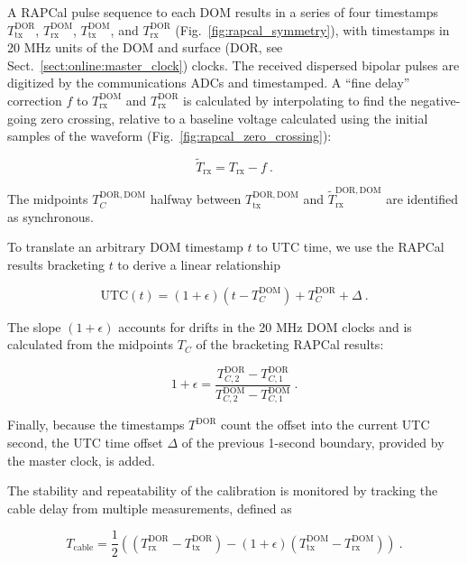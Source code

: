 A RAPCal pulse sequence to each DOM results in a series of four timestamps
$T_{\mathrm{tx}}^{\mathrm{DOR}}$, $T_{\mathrm{rx}}^{\mathrm{DOM}}$, 
$T_{\mathrm{tx}}^{\mathrm{DOM}}$,  and $T_{\mathrm{rx}}^{\mathrm{DOR}}$
(Fig.~\ref{fig:rapcal_symmetry}), with timestamps in 20 MHz units
of the DOM and surface (DOR, see Sect.~\ref{sect:online:master_clock}) clocks.  The received dispersed bipolar pulses
are digitized by the communications ADCs and 
timestamped.  A ``fine delay'' correction $f$ to
$T_{\mathrm{rx}}^{\mathrm{DOM}}$ and $T_{\mathrm{rx}}^{\mathrm{DOR}}$ is calculated by interpolating
to find the negative-going zero crossing, relative to a baseline voltage
calculated using the initial samples of the waveform (Fig.~\ref{fig:rapcal_zero_crossing}):

\begin{equation}
  \tilde{T}_{\mathrm{rx}} = T_{\mathrm{rx}} - f\ .
\end{equation}


\noindent The midpoints $T_C^{\mathrm{DOR,DOM}}$ halfway between $T_\mathrm{tx}^{\mathrm{DOR,DOM}}$ and
$\tilde{T}_\mathrm{rx}^{\mathrm{DOR,DOM}}$ are identified as synchronous.

To translate an arbitrary DOM timestamp $t$ to UTC
time, we use the RAPCal results bracketing $t$ to derive a linear
relationship

\begin{equation}
  \mathrm{UTC}(t) = (1+\epsilon)(t - T_C^{\mathrm{DOM}}) +
  T_C^{\mathrm{DOR}} + \Delta\ .
\end{equation}

\noindent The slope $(1+\epsilon)$ accounts for drifts in the 20 MHz DOM
clocks and is calculated from the midpoints $T_C$ of the bracketing RAPCal
results: 

\begin{equation}
  1+\epsilon = \frac{T_{C,2}^{\mathrm{DOR}} -
    T_{C,1}^{\mathrm{DOR}}}{T_{C,2}^{\mathrm{DOM}} -
    T_{C,1}^{\mathrm{DOM}}}\ .
\end{equation}

\noindent Finally, because the timestamps $T^{\mathrm{DOR}}$ count the offset into
the current UTC second, the UTC time offset $\Delta$ of the previous
1-second boundary, provided by the master clock, is added.

The stability and repeatability of the calibration is monitored by
tracking the cable delay from multiple measurements, defined as

\begin{equation}
  T_{\mathrm{cable}} = \frac{1}{2} \left( ( T_{\mathrm{rx}}^{\mathrm{DOR}} -
  T_{\mathrm{tx}}^{\mathrm{DOR}} ) - (1+\epsilon)(T_{\mathrm{tx}}^{\mathrm{DOM}} -
  T_{\mathrm{rx}}^{\mathrm{DOM}} )\right) \ .
\end{equation}

